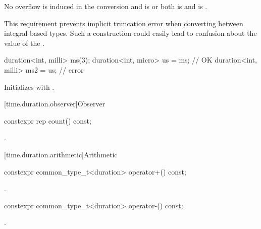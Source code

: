 \begin{itemdescr}
\pnum
\constraints
No overflow is induced in the conversion and
 is  or both
 is  and
 is .
\begin{note}
This
requirement prevents implicit truncation error when converting between
integral-based  types. Such a construction could easily lead to
confusion about the value of the .
\end{note}
\begin{example}
\begin{codeblock}
duration<int, milli> ms(3);
duration<int, micro> us = ms;       // OK
duration<int, milli> ms2 = us;      // error
\end{codeblock}
\end{example}

\pnum
\effects
Initializes  with .
\end{itemdescr}

[time.duration.observer]{Observer}

%
\begin{itemdecl}
constexpr rep count() const;
\end{itemdecl}

\begin{itemdescr}
\pnum
\returns
{}.
\end{itemdescr}

[time.duration.arithmetic]{Arithmetic}

%
\begin{itemdecl}
constexpr common_type_t<duration> operator+() const;
\end{itemdecl}

\begin{itemdescr}
\pnum
\returns
{}.
\end{itemdescr}

%
\begin{itemdecl}
constexpr common_type_t<duration> operator-() const;
\end{itemdecl}

\begin{itemdescr}
\pnum
\returns
{}.
\end{itemdescr}

